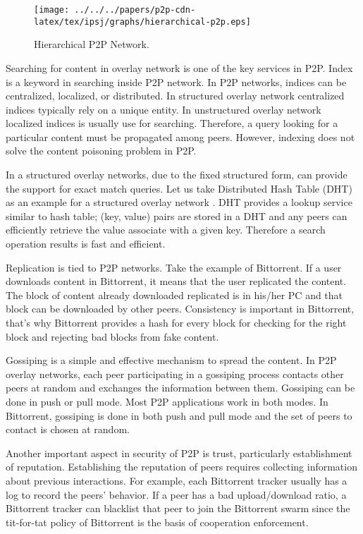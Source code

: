 \begin{figure}[tb]
\begin{center}
\texttt{[image: ../../../papers/p2p-cdn-latex/tex/ipsj/graphs/hierarchical-p2p.eps]}
\end{center}
\caption{Hierarchical P2P Network.} 
\label{fig:hierarchicalp2p}
\end{figure}



Searching for content in overlay network is one of the key services in P2P.
Index is a keyword in searching inside P2P network.
In P2P networks, indices can be centralized, localized, or distributed. 
In structured overlay network centralized indices typically rely on a unique entity.
In unstructured overlay network localized indices is usually use for searching. 
Therefore, a query looking for a particular content must be propagated among peers.
However, indexing does not solve the content poisoning problem in P2P.

In a structured overlay networks, due to the fixed structured form, can provide the support for exact match queries.  
Let us take Distributed Hash Table (DHT) as an example for a structured overlay network \cite{Balakrishnan:2003:LUD:606272.606299}.  
DHT provides a lookup service similar to hash table; (key, value) pairs are stored in a DHT and any peers can efficiently retrieve the value associate with a given key. 
Therefore a search operation results is fast and efficient.

Replication is tied to P2P networks.  
Take the example of Bittorrent.  
If a user downloads content in Bittorrent,  it means that the user replicated the content.  
The block of content  already downloaded replicated is in his/her PC and that block can be downloaded by other peers.
Consistency is important in Bittorrent, that's why Bittorrent provides a hash for every block for checking for the right block and rejecting bad blocks from fake content.

Gossiping is a simple and effective mechanism to spread the content. 
In P2P overlay networks, each peer participating in a gossiping process contacts other peers at random and exchanges the information between them.
Gossiping can be done in push or pull mode.
Most P2P applications work in both modes.
In Bittorrent, gossiping is done in both push and pull mode and the set of peers to contact is chosen at random.

Another important aspect in security of P2P is trust, particularly establishment of reputation. 
Establishing the reputation of peers requires collecting information about previous interactions. 
For example, each Bittorrent tracker usually has a log to record the peers' behavior. 
If a peer has a bad upload/download ratio, a Bittorrent tracker can blacklist that peer to join the Bittorrent swarm since the tit-for-tat policy of Bittorrent is the basis of cooperation enforcement.

